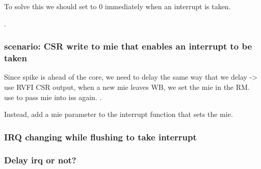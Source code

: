 To solve this we should set  to 0 immediately when an interrupt is taken.

.


\subsubsection{scenario: CSR write to mie that enables an interrupt to be taken }

Since spike is ahead of the core, we need to delay  the same way that we delay 
-> use RVFI CSR output, when a new mie leaves WB, we set the mie in the RM. 
use  to pass mie into iss again. .

Instead, add a mie parameter to the interrupt function that sets the mie.


\subsubsection{IRQ changing while flushing to take interrupt}

\subsubsection{Delay irq or not?}